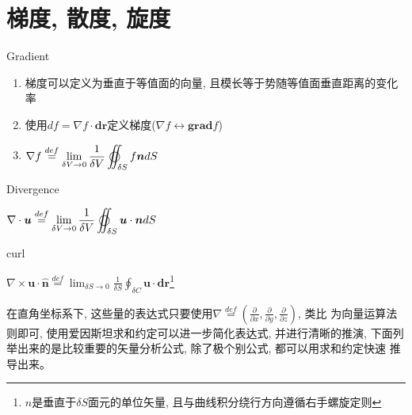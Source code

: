 \section{梯度, 散度, 旋度}
\begin{define}{Gradient}
    \begin{enumerate} 
        \item  梯度可以定义为垂直于等值面的向量, 且模长等于势随等值面垂直距离的变化率
        \item  使用$df=\nabla f\cdot\bm{dr}$定义梯度($\nabla f \longleftrightarrow \bm{grad}f$)
        \item  \begin{math}
                \displaystyle
                \nabla f\overset{def}{=}\lim_{\delta V \to 0}\frac{1}{\delta V} \varoiint_{\delta S} f \bm{n}dS
                \end{math}
    \end{enumerate}
\end{define}
\begin{define}{Divergence}
    \begin{center}
        \begin{math}
        \displaystyle
        \nabla \cdot \bm{u} \overset{def}{=}\lim_{\delta V \to 0}\frac{1}{\delta V} \varoiint_{\delta S} \bm{u} \cdot \bm{n}dS
        \end{math}
    \end{center}
\end{define}
\begin{define}{curl}
    \begin{center}
        \begin{math}
        \displaystyle
        \nabla \times \bm{u} \cdot \bm{\hat{n}} \overset{def}{=}\lim_{\delta S \to 0}\frac{1}{\delta S} \oint_{\delta C} \bm{u} \cdot \bm{dr}
        \end{math}\footnote[0]{$\hat{n}$是垂直于$\delta S$面元的单位矢量, 且与曲线积分绕行方向遵循右手螺旋定则}
    \end{center}
\end{define}
在直角坐标系下, 这些量的表达式只要使用$\nabla\overset{def}{=}(\frac{\partial}{\partial x},\frac{\partial}{\partial y},\frac{\partial}{\partial z})$, 类比
为向量运算法则即可, 使用爱因斯坦求和约定可以进一步简化表达式, 并进行清晰的推演, 下面列举出来的是比较重要的矢量分析公式, 除了极个别公式, 都可以用求和约定快速
推导出来。
